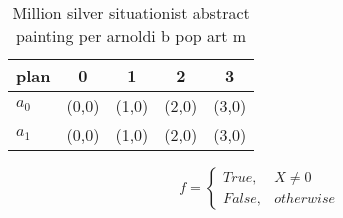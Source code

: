 \documentclass[a4paper]{article}
\begin{document}
\begin{table}
\begin{adjustbox}{width=0.5\columnwidth}
\begin{tabular}{|l|l|l|l|l|}
\hline
\textbf{plan} & \multicolumn{1}{c|}{\textbf{0}} & \multicolumn{1}{c|}{\textbf{1}} & \multicolumn{1}{c|}{\textbf{2}} & \multicolumn{1}{c|}{\textbf{3}} \\ \hline
\textbf{$a_0$}  & (0,0) & (1,0) & (2,0) & (3,0) \\ \hline
\textbf{$a_1$}  & (0,0) & (1,0) & (2,0) & (3,0) \\ \hline
\end{tabular}
\end{adjustbox}
\caption{Million silver situationist abstract painting per arnoldi b pop art m
}
\end{table}

\begin{equation}   f =
\begin{cases} True, & X \neq 0\\
False, & otherwise
\end{cases}
\end{equation}
\end{document}
